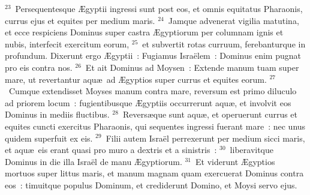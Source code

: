 ${}^{23}$~Persequentesque \AE gyptii ingressi sunt post eos, et omnis equitatus Pharaonis, currus ejus et equites per medium maris.
${}^{24}$~Jamque advenerat vigilia matutina, et ecce respiciens Dominus super castra \AE gyptiorum per columnam ignis et nubis, interfecit exercitum eorum,
${}^{25}$~et subvertit rotas curruum, ferebanturque in profundum. Dixerunt ergo \AE gyptii~: Fugiamus Isra\"elem~: Dominus enim pugnat pro eis contra nos.
${}^{26}$~Et ait Dominus ad Moysen~: Extende manum tuam super mare, ut revertantur aqu\ae\ ad \AE gyptios super currus et equites eorum.
${}^{27}$~Cumque extendisset Moyses manum contra mare, reversum est primo diluculo ad priorem locum~: fugientibusque \AE gyptiis occurrerunt aqu\ae , et involvit eos Dominus in mediis fluctibus.
${}^{28}$~Revers\ae que sunt aqu\ae , et operuerunt currus et equites cuncti exercitus Pharaonis, qui sequentes ingressi fuerant mare~: nec unus quidem superfuit ex eis.
${}^{29}$~Filii autem Isra\"el perrexerunt per medium sicci maris, et aqu\ae\ eis erant quasi pro muro a dextris et a sinistris~:
${}^{30}$~liberavitque Dominus in die illa Isra\"el de manu \AE gyptiorum.
${}^{31}$~Et viderunt \AE gyptios mortuos super littus maris, et manum magnam quam exercuerat Dominus contra eos~: timuitque populus Dominum, et crediderunt Domino, et Moysi servo ejus.
